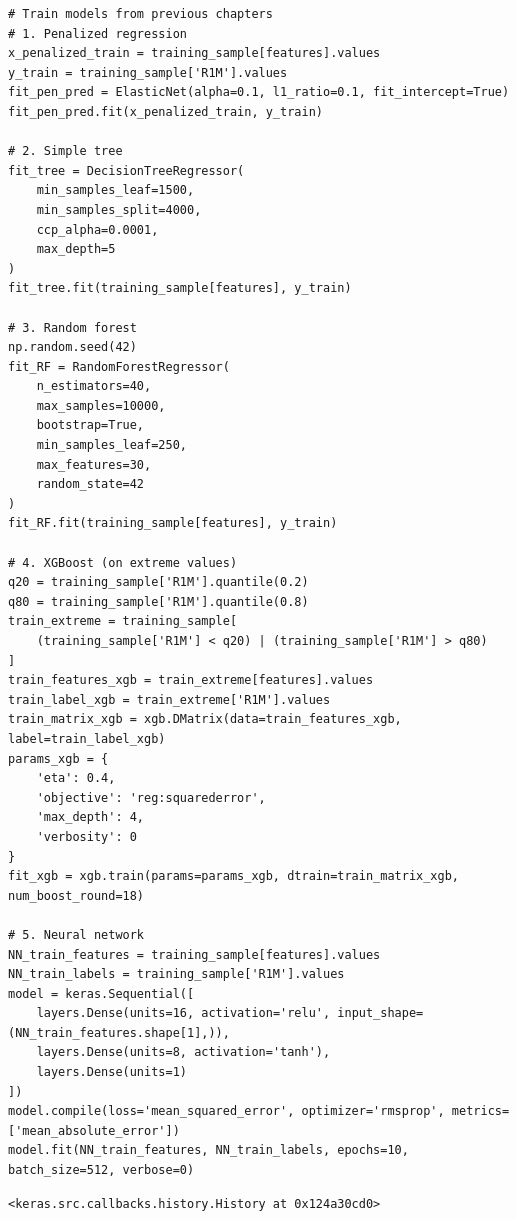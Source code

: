 \begin{verbatim}
# Train models from previous chapters
# 1. Penalized regression
x_penalized_train = training_sample[features].values
y_train = training_sample['R1M'].values
fit_pen_pred = ElasticNet(alpha=0.1, l1_ratio=0.1, fit_intercept=True)
fit_pen_pred.fit(x_penalized_train, y_train)

# 2. Simple tree
fit_tree = DecisionTreeRegressor(
    min_samples_leaf=1500,
    min_samples_split=4000,
    ccp_alpha=0.0001,
    max_depth=5
)
fit_tree.fit(training_sample[features], y_train)

# 3. Random forest
np.random.seed(42)
fit_RF = RandomForestRegressor(
    n_estimators=40,
    max_samples=10000,
    bootstrap=True,
    min_samples_leaf=250,
    max_features=30,
    random_state=42
)
fit_RF.fit(training_sample[features], y_train)

# 4. XGBoost (on extreme values)
q20 = training_sample['R1M'].quantile(0.2)
q80 = training_sample['R1M'].quantile(0.8)
train_extreme = training_sample[
    (training_sample['R1M'] < q20) | (training_sample['R1M'] > q80)
]
train_features_xgb = train_extreme[features].values
train_label_xgb = train_extreme['R1M'].values
train_matrix_xgb = xgb.DMatrix(data=train_features_xgb, label=train_label_xgb)
params_xgb = {
    'eta': 0.4,
    'objective': 'reg:squarederror',
    'max_depth': 4,
    'verbosity': 0
}
fit_xgb = xgb.train(params=params_xgb, dtrain=train_matrix_xgb, num_boost_round=18)

# 5. Neural network
NN_train_features = training_sample[features].values
NN_train_labels = training_sample['R1M'].values
model = keras.Sequential([
    layers.Dense(units=16, activation='relu', input_shape=(NN_train_features.shape[1],)),
    layers.Dense(units=8, activation='tanh'),
    layers.Dense(units=1)
])
model.compile(loss='mean_squared_error', optimizer='rmsprop', metrics=['mean_absolute_error'])
model.fit(NN_train_features, NN_train_labels, epochs=10, batch_size=512, verbose=0)
\end{verbatim}

\begin{verbatim}
<keras.src.callbacks.history.History at 0x124a30cd0>
\end{verbatim}


